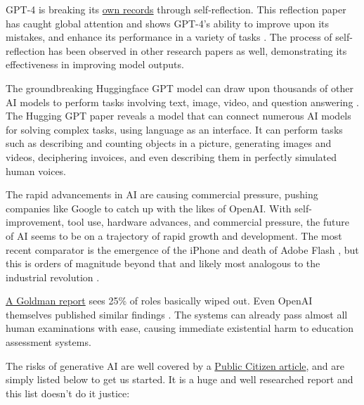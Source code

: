 GPT-4 is breaking its \href{https://nanothoughts.substack.com/p/reflecting-on-reflexion}{own records} through self-reflection. This reflection paper has caught global attention and shows GPT-4's ability to improve upon its mistakes, and enhance its performance in a variety of tasks \cite{shinn2023reflexion}. The process of self-reflection has been observed in other research papers as well, demonstrating its effectiveness in improving model outputs.\par
The groundbreaking Huggingface GPT model can draw upon thousands of other AI models to perform tasks involving text, image, video, and question answering \cite{shen2023hugginggpt}. The Hugging GPT paper reveals a model that can connect numerous AI models for solving complex tasks, using language as an interface. It can perform tasks such as describing and counting objects in a picture, generating images and videos, deciphering invoices, and even describing them in perfectly simulated human voices.\par
The rapid advancements in AI are causing commercial pressure, pushing companies like Google to catch up with the likes of OpenAI. With self-improvement, tool use, hardware advances, and commercial pressure, the future of AI seems to be on a trajectory of rapid growth and development. The most recent comparator is the emergence of the iPhone and death of Adobe Flash \cite{horton2019death}, but this is orders of magnitude beyond that and likely most analogous to the industrial revolution \cite{trajtenberg2018ai}. \par 
\href{https://www.key4biz.it/wp-content/uploads/2023/03/Global-Economics-Analyst_-The-Potentially-Large-Effects-of-Artificial-Intelligence-on-Economic-Growth-Briggs_Kodnani.pdf}{A Goldman report} sees 25\% of roles basically wiped out. Even OpenAI themselves published similar findings \cite{eloundou2023gpts}. The systems can already pass almost all human examinations with ease, causing immediate existential harm to education assessment systems.\par 
The risks of generative AI are well covered by a \href{https://www.citizen.org/article/sorry-in-advance-generative-ai-artificial-intellligence-chatgpt-report/}{Public Citizen article}, and are simply listed below to get us started. It is a huge and well researched report and this list doesn't do it justice:

